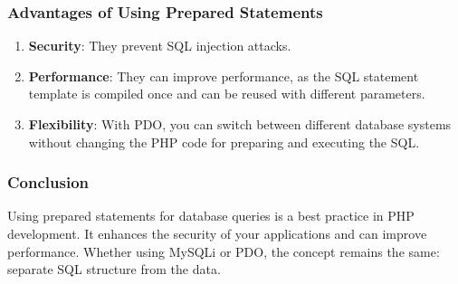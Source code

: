 \documentclass[11pt]{article}
\begin{document}
\subsubsection{Advantages of Using Prepared Statements}
\label{sec:org94cccb6}
\begin{enumerate}
\item \textbf{Security}: They prevent SQL injection attacks.
\item \textbf{Performance}: They can improve performance, as the SQL statement
template is compiled once and can be reused with different
parameters.
\item \textbf{Flexibility}: With PDO, you can switch between different database
systems without changing the PHP code for preparing and executing the
SQL.
\end{enumerate}

\subsubsection{Conclusion}
\label{sec:org1f7e722}
Using prepared statements for database queries is a best practice in PHP
development. It enhances the security of your applications and can
improve performance. Whether using MySQLi or PDO, the concept remains
the same: separate SQL structure from the data.
\end{document}
